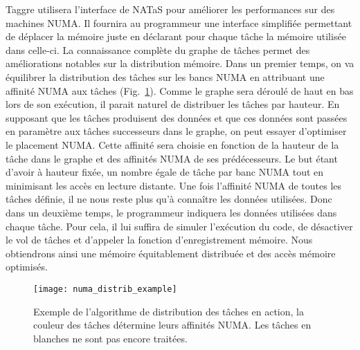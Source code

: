 Taggre utilisera l'interface de NATaS pour améliorer les performances sur des machines NUMA.
%
Il fournira au programmeur une interface simplifiée permettant de déplacer la mémoire juste en déclarant pour chaque tâche la mémoire utilisée dans celle-ci.
%
La connaissance complète du graphe de tâches permet des améliorations notables sur la distribution mémoire.
%
Dans un premier temps, on va équilibrer la distribution des tâches sur les bancs NUMA en attribuant une affinité NUMA aux tâches (Fig.~\ref{fig:numa_distrib_example}).
%
Comme le graphe sera déroulé de haut en bas lors de son exécution, il parait naturel de distribuer les tâches par hauteur.
%
En supposant que les tâches produisent des données et que ces données sont passées en paramètre aux tâches successeurs dans le graphe, on peut essayer d'optimiser le placement NUMA.
%
Cette affinité sera choisie en fonction de la hauteur de la tâche dans le graphe et des affinités NUMA de ses prédécesseurs.
%
Le but étant d'avoir à hauteur fixée, un nombre égale de tâche par banc NUMA tout en minimisant les accès en lecture distante.
%
Une fois l'affinité NUMA de toutes les tâches définie, il ne nous reste plus qu'à connaître les données utilisées.
%
Donc dans un deuxième temps, le programmeur indiquera les données utilisées dans chaque tâche.
%
Pour cela, il lui suffira de simuler l'exécution du code, de désactiver le vol de tâches et d'appeler la fonction d'enregistrement mémoire.
%
Nous obtiendrons ainsi une mémoire équitablement distribuée et des accès mémoire optimisés.





\begin{figure}[!h]
  \centering
  \texttt{[image: numa\_distrib\_example]}
  \caption{Exemple de l'algorithme de distribution des tâches en action, la couleur des tâches détermine leurs affinités NUMA. Les tâches en blanches ne sont pas encore traitées.}
  \label{fig:numa_distrib_example}
\end{figure}
